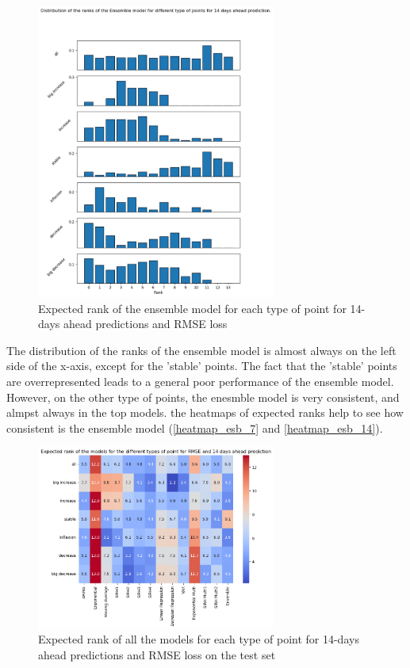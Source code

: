 \begin{figure}
    \centering
    \includegraphics[width=0.7\textwidth]{figures/esb_rank_14.png}
    \caption{Expected rank of the ensemble model for each type of point for 14-days ahead predictions and RMSE loss}
    \label{fig:esb_rank_14}
\end{figure}

The distribution of the ranks of the ensemble model is almost always on the left side of the x-axis, except for the 'stable' points. 
The fact that the 'stable' points are overrepresented leads to a general poor performance of the ensemble model.
However, on the other type of points, the enesmble model is very consistent, and almpst always in the top models. 
the heatmaps of expected ranks help to see how consistent is the ensemble model (\ref{heatmap_esb_7} and \ref{heatmap_esb_14}). 

\begin{figure}
    \centering
    \includegraphics[width=0.7\textwidth]{figures/heatmap_esb_14.png}
    \caption{Expected rank of all the models for each type of point for 14-days ahead predictions and RMSE loss on the test set}
    \label{fig:heatmap_esb_14}
\end{figure}



